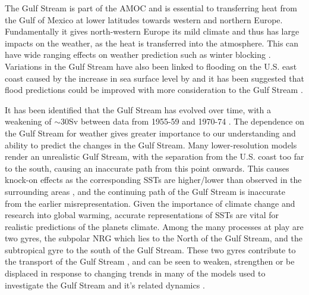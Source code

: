 \documentclass[..\report.tex]{subfiles}
\begin{document}
The Gulf Stream is part of the \gls{AMOC} and is essential to transferring heat from the Gulf of Mexico at lower latitudes towards western and northern Europe.
Fundamentally it gives north-western Europe its mild climate and thus has large impacts on the weather, as the heat is transferred into the atmosphere.
This can have wide ranging effects on weather prediction such as winter blocking \citep{Scaife2011a}.
Variations in the Gulf Stream have also been linked to flooding on the U.S. east coast caused by the increase in sea surface level by \citet{Ezer2015} and it has been suggested that flood predictions could be improved with more consideration to the Gulf Stream \citep{Ezer2014}. \par
It has been identified that the Gulf Stream has evolved over time, with a weakening of $\sim$30Sv between data from 1955-59 and 1970-74 \citep{Greatbatch1991}.
The dependence on the Gulf Stream for weather gives greater importance to our understanding and ability to predict the changes in the Gulf Stream.
Many lower-resolution models render an unrealistic Gulf Stream, 
with the separation from the U.S. coast too far to the south, causing an inaccurate path from this point onwards.
This causes knock-on effects as the corresponding \glspl{SST} are higher/lower than observed in the surrounding areas \citep{Greatbatch2004},
 and the continuing path of the Gulf Stream is inaccurate from the earlier misrepresentation.
Given the importance of climate change and research into global warming, accurate representations of \glspl{SST} are vital for realistic predictions of the planets climate.
Among the many processes at play are two gyres, the subpolar \gls{NRG} which lies to the North of the Gulf Stream, and the subtropical gyre to the south of the Gulf Stream. These two gyres contribute to the transport of the Gulf Stream \citep{Hogg1986}, and can be seen to weaken, strengthen or be displaced in response to changing trends in many of the models used to investigate the Gulf Stream and it's related dynamics \citep{Greatbatch1991,Zhang2007}.


\end{document}
